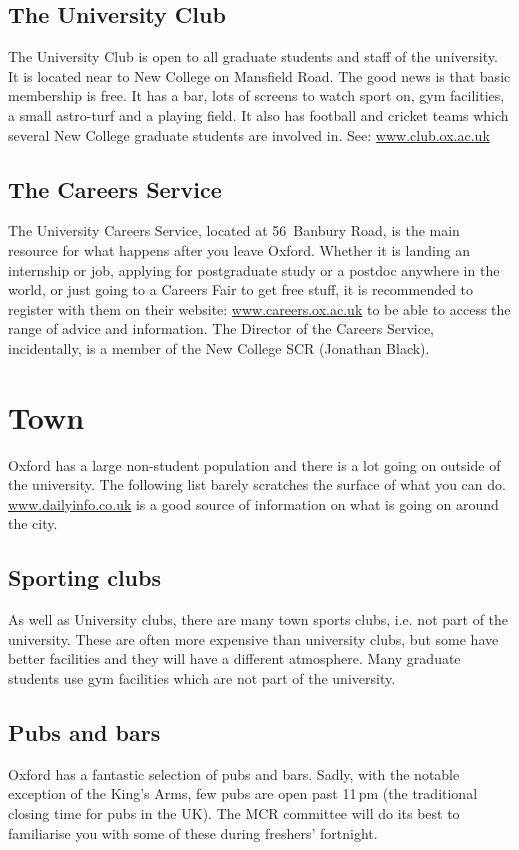 \subsection{The University Club}
The University Club is open to all graduate students and staff of the
university. It is located near to New College on Mansfield Road. The good news
is that basic membership is free. It has a bar, lots of screens to watch sport
on, gym facilities, a small astro-turf and a playing field. It also has football and cricket teams which several New College graduate students are involved in. See: \url{www.club.ox.ac.uk}
\subsection{The Careers Service}
The University Careers Service, located at 56~Banbury Road, is the main resource
for what happens after you leave Oxford. Whether it is landing an internship or
job, applying for postgraduate study or a postdoc anywhere in the world, or just going to a Careers Fair to get free stuff, it is recommended to register with them on their website: \url{www.careers.ox.ac.uk} to be able to access the range of advice and information. The Director of the Careers Service, incidentally, is a member of the New College SCR (Jonathan Black).

\section{Town}
Oxford has a large non-student population and there is a lot going on outside of
the university. The following list barely scratches the surface of what you can
do. \url{www.dailyinfo.co.uk} is a good source of information on what is going
on around the city.
\subsection{Sporting clubs}
As well as University clubs, there are many town sports clubs, i.e. not part of the university. These are often more expensive than university clubs, but some have better facilities and they will have a different atmosphere. Many graduate students use gym facilities which are not part of the university.
\subsection{Pubs and bars}
Oxford has a fantastic selection of pubs and bars. Sadly, with the notable
exception of the King's Arms, few pubs are open past 11\,pm (the traditional
closing time for pubs in the UK). The MCR committee will do its best to familiarise you with some of these during freshers' fortnight.
